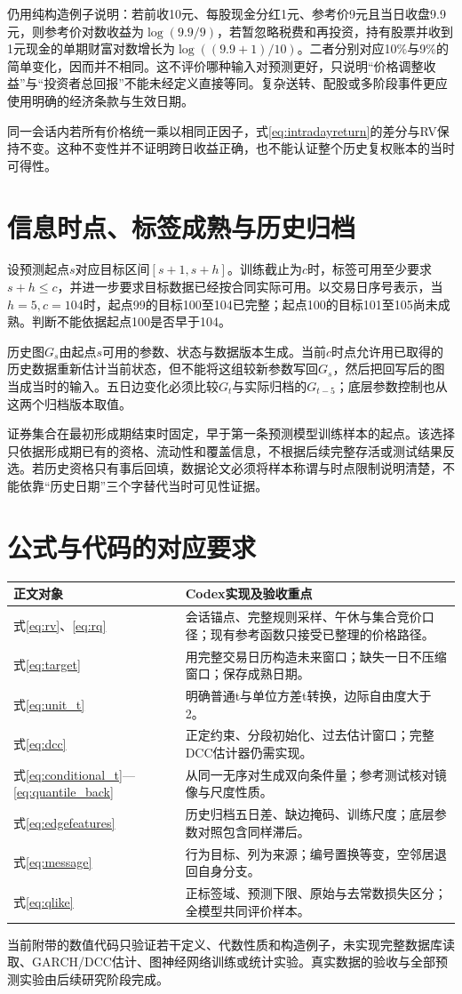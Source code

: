 仍用纯构造例子说明：若前收10元、每股现金分红1元、参考价9元且当日收盘9.9元，则参考价对数收益为$\log(9.9/9)$，若暂忽略税费和再投资，持有股票并收到1元现金的单期财富对数增长为$\log((9.9+1)/10)$。二者分别对应10\%与9\%的简单变化，因而并不相同。这不评价哪种输入对预测更好，只说明“价格调整收益”与“投资者总回报”不能未经定义直接等同。复杂送转、配股或多阶段事件更应使用明确的经济条款与生效日期。

同一会话内若所有价格统一乘以相同正因子，式\eqref{eq:intradayreturn}的差分与RV保持不变。这种不变性并不证明跨日收益正确，也不能认证整个历史复权账本的当时可得性。

\section{信息时点、标签成熟与历史归档}
设预测起点$s$对应目标区间$[s+1,s+h]$。训练截止为$c$时，标签可用至少要求$s+h\leq c$，并进一步要求目标数据已经按合同实际可用。以交易日序号表示，当$h=5,c=104$时，起点99的目标100至104已完整；起点100的目标101至105尚未成熟。判断不能依据起点100是否早于104。

历史图$G_s$由起点$s$可用的参数、状态与数据版本生成。当前$c$时点允许用已取得的历史数据重新估计当前状态，但不能将这组较新参数写回$G_s$，然后把回写后的图当成当时的输入。五日边变化必须比较$G_t$与实际归档的$G_{t-5}$；底层参数控制也从这两个归档版本取值。

证券集合在最初形成期结束时固定，早于第一条预测模型训练样本的起点。该选择只依据形成期已有的资格、流动性和覆盖信息，不根据后续完整存活或测试结果反选。若历史资格只有事后回填，数据论文必须将样本称谓与时点限制说明清楚，不能依靠“历史日期”三个字替代当时可见性证据。

\section{公式与代码的对应要求}
\begin{longtable}{p{}p{}}
\toprule 正文对象 & Codex实现及验收重点\\\midrule\endhead
式\eqref{eq:rv}、\eqref{eq:rq} & 会话锚点、完整规则采样、午休与集合竞价口径；现有参考函数只接受已整理的价格路径。\\
式\eqref{eq:target} & 用完整交易日历构造未来窗口；缺失一日不压缩窗口；保存成熟日期。\\
式\eqref{eq:unit_t} & 明确普通t与单位方差t转换，边际自由度大于2。\\
式\eqref{eq:dcc} & 正定约束、分段初始化、过去估计窗口；完整DCC估计器仍需实现。\\
式\eqref{eq:conditional_t}—\eqref{eq:quantile_back} & 从同一无序对生成双向条件量；参考测试核对镜像与尺度性质。\\
式\eqref{eq:edgefeatures} & 历史归档五日差、缺边掩码、训练尺度；底层参数对照包含同样滞后。\\
式\eqref{eq:message} & 行为目标、列为来源；编号置换等变，空邻居退回自身分支。\\
式\eqref{eq:qlike} & 正标签域、预测下限、原始与去常数损失区分；全模型共同评价样本。\\
\bottomrule
\end{longtable}
当前附带的数值代码只验证若干定义、代数性质和构造例子，未实现完整数据库读取、GARCH/DCC估计、图神经网络训练或统计实验。真实数据的验收与全部预测实验由后续研究阶段完成。
